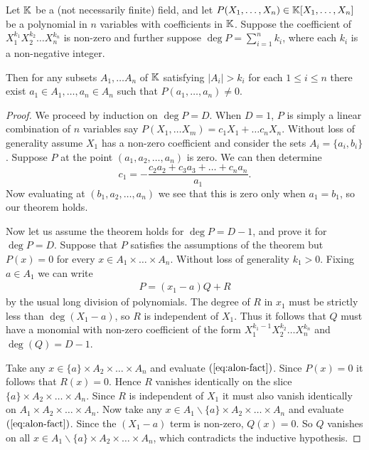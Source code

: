 \begin{theorem}
    Let $\mathbb K$ be a (not necessarily finite) field, and let $P(X_1,\dots, X_n) \in \mathbb K[X_1,\dots, X_n]$ be a polynomial in $n$ variables with coefficients in $\mathbb K$. Suppose the coefficient of $X_1^{k_1}X_2^{k_2}\dots X_n^{k_n}$ is non-zero and further suppose $\deg P = \sum_{i=1}^n k_i$, where each $k_i$ is a non-negative integer.

    Then for any subsets $A_1,\dots A_n$ of $\mathbb K$ satisfying $|A_i| > k_i$ for each $1\leq i\leq n$ there exist $a_1 \in A_1, \dots, a_n \in A_n$ such that $P(a_1,\dots, a_n) \neq 0$.
    \label{thm:comb-nullstellensatz}
\end{theorem}
\begin{proof}
    We proceed by induction on $\deg P = D$. When $D=1$, $P$ is simply a linear combination of $n$ variables say $P(X_1,\dots X_m) = c_1 X_1 + \dots c_n X_n$. Without loss of generality assume $X_1$ has a non-zero coefficient and consider the sets $A_i = \{a_{i}, b_{i}\}$. Suppose $P$ at the point $(a_{1}, a_{2}, \dots, a_{n})$ is zero. We can then determine 
    \[c_{1} =- \frac{c_2 a_{2} + c_3 a_{3}+\dots+ c_n a_{n}}{a_{1}}.\] 
    Now evaluating at $(b_1, a_{2}, \dots, a_{n})$ we see that this is zero only when $a_{1} = b_{1}$, so our theorem holds. 

    
    Now let us assume the theorem holds for $\deg P = D -1$, and prove it for $\deg P = D$.
    Suppose that $P$ satisfies the assumptions of the theorem but $P(x) = 0$ for every $x \in A_1 \times \dots \times A_n$.
    Without loss of generality $k_1 > 0.$ Fixing $a\in A_1$ we can write
    \begin{align}
        P = (x_1-a)Q +R \label{eq:alon-fact}
    \end{align}
    by the usual long division of polynomials. The degree of $R$ in $x_1$ must be strictly less than $\deg(X_1-a)$, so $R$ is independent of $X_1$. Thus it follows that $Q$ must have a monomial with non-zero coefficient of the form $X_1^{k_{1} -1} X_2^{k_2} \dots X_n^{k_n}$ and 
    $\deg (Q) = D-1$.

    Take any $x \in \{a\} \times A_2 \times \dots \times A_n$ and evaluate $(\ref{eq:alon-fact})$. Since $P(x) = 0$ it follows that $R(x) = 0$. Hence $R$ vanishes identically on the slice $\{a\} \times A_2 \times \dots \times A_n$. Since $R$ is independent of $X_1$ it must also vanish identically on $A_1 \times A_2 \times \dots \times A_n$.
    Now take any $x \in A_1 \backslash \{a\} \times A_2 \times \dots \times A_n$ and evaluate $(\ref{eq:alon-fact})$. Since the $(X_1 - a)$ term is non-zero, $Q(x) =0$. So $Q$ vanishes on all $x \in A_1 \backslash \{a\} \times A_2 \times \dots \times A_n$, which contradicts the inductive hypothesis.
\end{proof}
